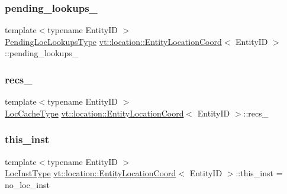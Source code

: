 \subsubsection{\texorpdfstring{pending\+\_\+lookups\+\_\+}{pending\_lookups\_}}
{\footnotesize\ttfamily template$<$typename Entity\+ID $>$ \\
\hyperlink{structvt_1_1location_1_1_entity_location_coord_a495c5dfc3aa444524af9aede4b20cfdc}{Pending\+Loc\+Lookups\+Type} \hyperlink{structvt_1_1location_1_1_entity_location_coord}{vt\+::location\+::\+Entity\+Location\+Coord}$<$ Entity\+ID $>$\+::pending\+\_\+lookups\+\_\+\hspace{0.3cm}{\ttfamily [private]}}

\mbox{\label{structvt_1_1location_1_1_entity_location_coord_a4822f7d8be8fd72319ad7a1823cf5fc9}} 
\subsubsection{\texorpdfstring{recs\+\_\+}{recs\_}}
{\footnotesize\ttfamily template$<$typename Entity\+ID $>$ \\
\hyperlink{structvt_1_1location_1_1_entity_location_coord_a8824e120b11c3234534a6dce11fe0c69}{Loc\+Cache\+Type} \hyperlink{structvt_1_1location_1_1_entity_location_coord}{vt\+::location\+::\+Entity\+Location\+Coord}$<$ Entity\+ID $>$\+::recs\+\_\+\hspace{0.3cm}{\ttfamily [private]}}

\mbox{\label{structvt_1_1location_1_1_entity_location_coord_ade191f7cf6aba682f960abef1ddab9fc}} 
\subsubsection{\texorpdfstring{this\+\_\+inst}{this\_inst}}
{\footnotesize\ttfamily template$<$typename Entity\+ID $>$ \\
\hyperlink{namespacevt_1_1location_a4db6456e8024af2d23fc5ae560fef866}{Loc\+Inst\+Type} \hyperlink{structvt_1_1location_1_1_entity_location_coord}{vt\+::location\+::\+Entity\+Location\+Coord}$<$ Entity\+ID $>$\+::this\+\_\+inst = no\+\_\+loc\+\_\+inst\hspace{0.3cm}{\ttfamily [private]}}



